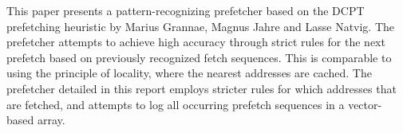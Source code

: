 This paper presents a pattern-recognizing prefetcher based on the DCPT prefetching heuristic by Marius Grannae, Magnus Jahre and Lasse Natvig. The prefetcher attempts to achieve high accuracy through strict rules for the next prefetch based on previously recognized fetch sequences. This is comparable to using the principle of locality, where the nearest addresses are cached. The prefetcher detailed in this report employs stricter rules for which addresses that are fetched, and attempts to log all occurring prefetch sequences in a vector-based array.
